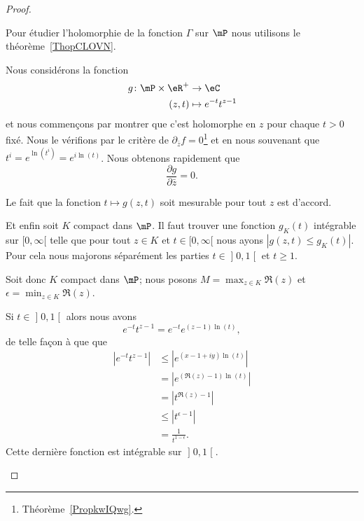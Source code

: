 \begin{proof}
	\begin{subproof}

		Pour étudier l'holomorphie de la fonction \( \Gamma\) sur \( \mP\) nous utilisons le théorème~\ref{ThopCLOVN}.

		Nous considérons la fonction
		\begin{equation}
			\begin{aligned}
				g\colon \mP\times \eR^+ & \to \eC                \\
				(z,t)                   & \mapsto  e^{-t}t^{z-1}
			\end{aligned}
		\end{equation}
		et nous commençons par montrer que c'est holomorphe en \( z\) pour chaque \( t>0\) fixé. Nous le vérifions par le critère de \( \partial_{\bar z}f=0\)\footnote{Théorème~\ref{PropkwIQwg}.} et en nous souvenant que \( t^i= e^{\ln(t^i)}= e^{i\ln(t)}\). Nous obtenons rapidement que
		\begin{equation}
			\frac{ \partial g }{ \partial \bar z }=0.
		\end{equation}

		Le fait que la fonction \( t\mapsto g(z,t)\) soit mesurable pour tout \( z\) est d'accord.

		Et enfin soit \( K\) compact dans \( \mP\). Il faut trouver une fonction \( g_K(t)\) intégrable sur \( \mathopen[ 0 , \infty [\) telle que pour tout \( z\in K\) et \( t\in\mathopen[ 0 , \infty [\) nous ayons \( | g(z,t)\leq g_K(t) |\). Pour cela nous majorons séparément les parties \( t\in\mathopen] 0 , 1 \mathclose[\) et \( t\geq 1\).

			Soit donc \( K\) compact dans \( \mP\); nous posons \( M=\max_{z\in K}\Re(z)\) et \( \epsilon=\min_{z\in K}\Re(z)\).

			Si \( t\in \mathopen] 0 , 1 \mathclose[\) alors nous avons
			\begin{equation}
				e^{-t}t^{z-1}= e^{-t} e^{(z-1)\ln(t)},
			\end{equation}
			de telle façon à que que
			\begin{subequations}
				\begin{align}
					|  e^{-t}t^{z-1} | & \leq|  e^{(x-1+iy)\ln(t)} |  \\
					                   & =|   e^{(\Re(z)-1)\ln(t)} |  \\
					                   & =| t^{\Re(z)-1} |            \\
					                   & \leq | t^{\epsilon-1} |      \\
					                   & =\frac{1}{ t^{1-\epsilon} }.
				\end{align}
			\end{subequations}
			Cette dernière fonction est intégrable sur \( \mathopen] 0 , 1 \mathclose[\).


\end{subproof}
\end{proof}
